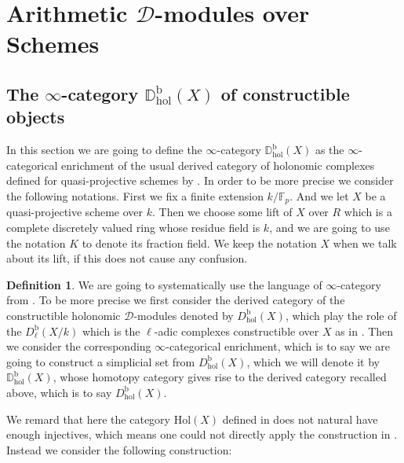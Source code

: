 \documentclass[11pt]{book}
\theoremstyle{definition}
\newtheorem{definition}[theorem]{Definition}
\numberwithin{equation}{section}
\begin{document}
\newpage
\section{Arithmetic $\mathcal{D}$-modules over Schemes}


\subsection{The $\infty$-category $\mathbb{D}^\mathrm{b}_\mathrm{hol}(X)$ of constructible objects}


\indent In this section we are going to define the $\infty$-category $\mathbb{D}^\mathrm{b}_\mathrm{hol}(X)$ as the $\infty$-categorical enrichment of the usual derived category of holonomic complexes defined for quasi-projective schemes by \cite{Abe1}. In order to be more precise we consider the following notations. First we fix a finite extension $k/\mathbb{F}_p$. And we let $X$ be a quasi-projective scheme over $k$. Then we choose some lift of $X$ over $R$ which is a complete discretely valued ring whose residue field is $k$, and we are going to use the notation $K$ to denote its fraction field. We keep the notation $X$ when we talk about its lift, if this does not cause any confusion. 



\begin{definition}
We are going to systematically use the language of $\infty$-category from \cite{Lurie1}. To be more precise we first consider the derived category of the constructible holonomic $\mathcal{D}$-modules denoted by $D^\mathrm{b}_\mathrm{hol}(X)$, which play the role of the $D^\mathrm{b}_\ell(X/k)$ which is the $\ell$-adic complexes constructible over $X$ as in \cite{GL1}. Then we consider the corresponding $\infty$-categorical enrichment, which is to say we are going to construct a simplicial set from $D^\mathrm{b}_\mathrm{hol}(X)$, which we will denote it by $\mathbb{D}^\mathrm{b}_\mathrm{hol}(X)$, whose homotopy category gives rise to the derived category recalled above, which is to say $D^\mathrm{b}_\mathrm{hol}(X)$.
\end{definition}


\indent We remard that here the category $\mathrm{Hol}(X)$ defined in \cite[Definition 1.1.1]{Abe1} does not natural have enough injectives, which means one could not directly apply the construction in \cite[Section 1.3.2, Section 1.3.5]{Lurie2}. Instead we consider the following construction:
\end{document}
